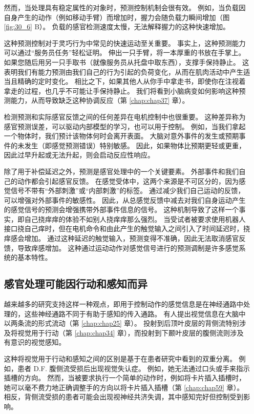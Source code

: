 然而，当处理具有稳定属性的对象时，预测控制机制会很有效。 例如，当负载因自身产生的动作（例如移动手臂）而增加时，握力会随负载力瞬间增加（图 \ref{fig:30_6} B）。 负载的感官检测速度太慢，无法解释握力的这种快速增加。

这种预测控制对于灵巧行为中常见的快速运动至关重要。 事实上，这种预测能力可以通过“服务员任务”轻松证明。 伸出一只手臂，将一本厚重的书放在手掌上。 如果您随后用另一只手取书（就像服务员从托盘中取东西），支撑手保持静止。 这表明我们有能力预测由我们自己的行为引起的负荷变化，从而在肌肉活动中产生适当且精确的定时变化。 相比之下，如果其他人从你手中拿走书，即使你在注视着拿走的过程，也几乎不可能让手保持静止。 我们将看到小脑病变如何影响这种预测能力，从而导致缺乏这种协调反应（第 \ref{chap:chap37} 章）。

检测预测和实际感官反馈之间的任何差异在电机控制中也很重要。 这种差异称为感官预测误差，可以驱动内部模型的学习，也可以用于控制。 例如，当我们拿起一个物体时，我们预计该物体何时会离开表面。 大脑对意外事件的发生或预期事件的未发生（即感觉预测错误）特别敏感。 因此，如果物体比预期更轻或更重，因此过早升起或无法升起，则会启动反应性响应。

除了用于补偿延迟之外，预测是感官处理中的一个关键要素。 外部事件和我们自己的动作都会引起感官反馈。 在感觉受体中，这两个来源是不可区分的，因为感觉信号不带有“外部刺激”或“内部刺激”的标签。 通过减少我们自己运动的反馈，可以增强对外部事件的敏感性。 因此，从总感觉反馈中减去对我们自身运动产生的感觉信号的预测会增强携带外部事件信息的信号。 这种机制导致了这样一个事实，即自己挠痒痒的体验不如别人挠痒痒那么强烈。 当受试者被要求使用机器人接口挠自己痒时，但在电机命令和由此产生的触觉输入之间引入了时间延迟时，挠痒感会增加。 通过这种延迟的触觉输入，预测变得不准确，因此无法取消感官反馈，导致痒感增加。 这种通过运动动作对感觉信号进行的预测调制是许多感觉系统的基本特性。

\subsection{感官处理可能因行动和感知而异}

越来越多的研究支持这样一种观点，即用于控制动作的感觉信息是在神经通路中处理的，这些神经通路不同于有助于感知的传入通路。 有人提出视觉信息在大脑中以两条流的形式流动（第 \ref{chap:chap25} 章）。 投射到后顶叶皮层的背侧流特别涉及将视觉用于行动（第 \ref{chap:chap34} 章），而投射到下颞叶皮层的腹侧流则涉及有意识的视觉感知。

这种将视觉用于行动和感知之间的区别是基于在患者研究中看到的双重分离。 例如，患者 D.F. 腹侧流受损后出现视觉失认症。 例如，她无法通过口头或手来指示插槽的方向。 然而，当被要求执行一个简单的动作时，例如将卡片插入插槽时，她可以毫不费力地正确调整手的方向以将卡片插入插槽（第 \ref{chap:chap59} 章）。 相反，背侧流受损的患者可能会出现视神经共济失调，其中感知完好但控制受到影响。


